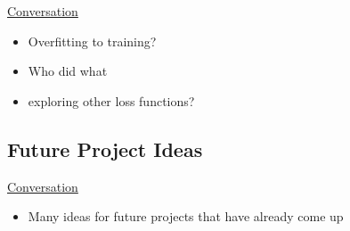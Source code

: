 \documentclass{article}
\begin{document}


\underline{Conversation}
\begin{itemize}
\item Overfitting to training?
\item Who did what
\item exploring other loss functions?
\end{itemize}

\subsection{Future Project Ideas}

\underline{Conversation}
\begin{itemize}
\item Many ideas for future projects that have already come up
\end{itemize}



\end{document}
